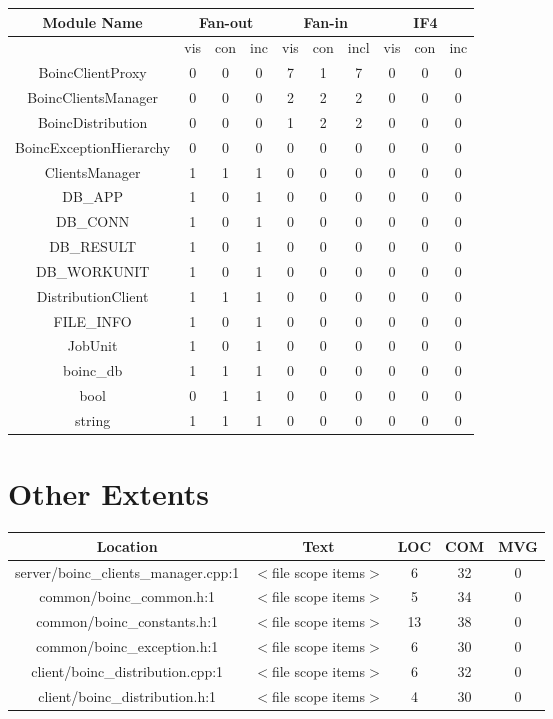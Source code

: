 \begin{tabular}{|c|c|c|c|c|c|c|c|c|c|}
        \hline
        Module Name & \multicolumn{3}{|c|}{Fan-out} & \multicolumn{3}{|c|}{Fan-in} & \multicolumn{3}{|c|}{IF4} \\
        \hline 
 &vis &con &inc &vis &con &incl &vis &con &inc \\
  \hline 
 BoincClientProxy & 0 & 0 & 0 & 7 & 1 & 7 & 0 & 0 & 0 \\
 \hline 
 BoincClientsManager & 0 & 0 & 0 & 2 & 2 & 2 & 0 & 0 & 0\\
 \hline 
 BoincDistribution & 0 & 0 & 0 & 1 & 2 & 2 & 0 & 0 & 0\\
 \hline 
 BoincExceptionHierarchy & 0 & 0 & 0 & 0 & 0 & 0 & 0 & 0 & 0\\
 \hline 
 ClientsManager & 1 & 1 & 1 & 0 & 0 & 0 & 0 & 0 & 0\\
 \hline 
 DB\_APP  & 1 & 0 & 1 & 0 & 0 & 0 & 0 & 0 & 0\\
 \hline 
 DB\_CONN & 1 & 0 & 1 & 0 & 0 & 0 & 0 & 0 & 0\\
 \hline 
 DB\_RESULT & 1 & 0 & 1 & 0 & 0 & 0 & 0 & 0 & 0\\
 \hline 
 DB\_WORKUNIT & 1 & 0 & 1 & 0 & 0 & 0 & 0 & 0 & 0\\
 \hline 
 DistributionClient & 1 & 1 & 1 & 0 & 0 & 0 & 0 & 0 & 0\\
 \hline 
 FILE\_INFO & 1 & 0 & 1 & 0 & 0 & 0 & 0 & 0 & 0\\
 \hline 
 JobUnit & 1 & 0 & 1 & 0 & 0 & 0 & 0 & 0 & 0\\
 \hline 
 boinc\_db & 1 & 1 & 1 & 0 & 0 & 0 & 0 & 0 & 0\\
 \hline 
 bool & 0 & 1 & 1 & 0 & 0 & 0 & 0 & 0 & 0\\
 \hline  
 string & 1 & 1 & 1 & 0 & 0 & 0 & 0 & 0 & 0\\
 \hline
\end{tabular}

\section{Other Extents}


\begin{tabular}{|c|c|c|c|c|}
\hline 
Location &Text &LOC &COM &MVG \\
 \hline 
server/boinc\_clients\_manager.cpp:1
 &$<$file scope items$>$ & 6 & 32 & 0 \\
 \hline 
common/boinc\_common.h:1
 &$<$file scope items$>$ & 5 & 34 & 0 \\
 \hline 
common/boinc\_constants.h:1
 &$<$file scope items$>$ & 13 & 38 & 0 \\
 \hline 
common/boinc\_exception.h:1
 &$<$file scope items$>$ & 6 & 30 & 0 \\
 \hline 
client/boinc\_distribution.cpp:1
 &$<$file scope items$>$ & 6 & 32 & 0 \\
 \hline 
client/boinc\_distribution.h:1
 &$<$file scope items$>$ & 4 & 30 & 0 \\
 \hline 
\end{tabular}

